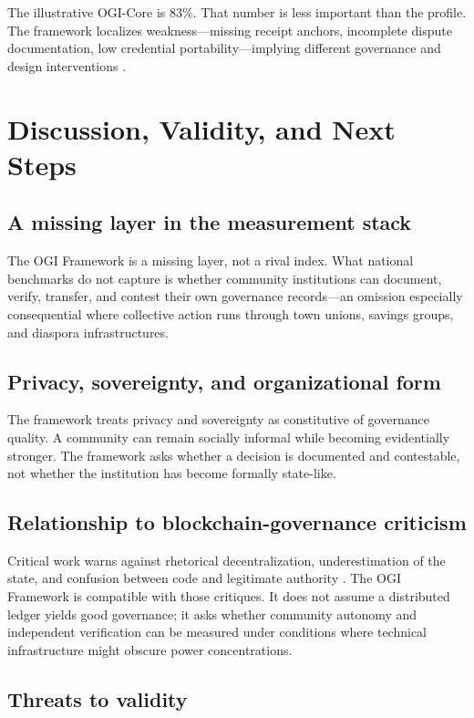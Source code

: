 \documentclass[sigconf]{acmart}
\begin{document}
The illustrative OGI-Core is 83\%. That number is less important than the profile. The framework localizes weakness---missing receipt anchors, incomplete dispute documentation, low credential portability---implying different governance and design interventions \cite{adebayo2018,francois2021,bjorkman2009}.

\section{Discussion, Validity, and Next Steps}

\subsection{A missing layer in the measurement stack}

The OGI Framework is a missing layer, not a rival index. What national benchmarks do not capture is whether community institutions can document, verify, transfer, and contest their own governance records---an omission especially consequential where collective action runs through town unions, savings groups, and diaspora infrastructures.

\subsection{Privacy, sovereignty, and organizational form}

The framework treats privacy and sovereignty as constitutive of governance quality. A community can remain socially informal while becoming evidentially stronger. The framework asks whether a decision is documented and contestable, not whether the institution has become formally state-like.

\subsection{Relationship to blockchain-governance criticism}

Critical work warns against rhetorical decentralization, underestimation of the state, and confusion between code and legitimate authority \cite{atzori2017,schneider2019,defilippi2018}. The OGI Framework is compatible with those critiques. It does not assume a distributed ledger yields good governance; it asks whether community autonomy and independent verification can be measured under conditions where technical infrastructure might obscure power concentrations.

\subsection{Threats to validity}
\end{document}

